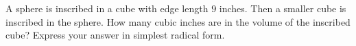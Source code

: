 A sphere is inscribed in a cube with edge length $9$ inches. Then a smaller cube is inscribed in the sphere. How many cubic inches are in the volume of the inscribed cube? Express your answer in simplest radical form.
